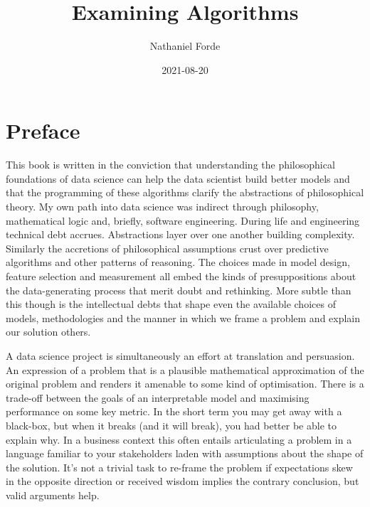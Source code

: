 \documentclass[]{tufte-book}
\title{Examining Algorithms}
\author{Nathaniel Forde}
\date{2021-08-20}
\theoremstyle{definition}
\theoremstyle{definition}
\theoremstyle{definition}
\theoremstyle{remark}
\begin{document}
\maketitle



{
\setcounter{tocdepth}{1}
\tableofcontents
}

\hypertarget{preface}{%
\chapter{Preface}\label{preface}}

This book is written in the conviction that understanding the philosophical foundations of data science can help the data scientist build better models and that the programming of these algorithms clarify the abstractions of philosophical theory. My own path into data science was indirect through philosophy, mathematical logic and, briefly, software engineering. During life and engineering technical debt accrues. Abstractions layer over one another building complexity. Similarly the accretions of philosophical assumptions crust over predictive algorithms and other patterns of reasoning. The choices made in model design, feature selection and measurement all embed the kinds of presuppositions about the data-generating process that merit doubt and rethinking. More subtle than this though is the intellectual debts that shape even the available choices of models, methodologies and the manner in which we frame a problem and explain our solution others.

A data science project is simultaneously an effort at translation and persuasion. An expression of a problem that is a plausible mathematical approximation of the original problem and renders it amenable to some kind of optimisation. There is a trade-off between the goals of an interpretable model and maximising performance on some key metric. In the short term you may get away with a black-box, but when it breaks (and it will break), you had better be able to explain why. In a business context this often entails articulating a problem in a language familiar to your stakeholders laden with assumptions about the shape of the solution. It's not a trivial task to re-frame the problem if expectations skew in the opposite direction or received wisdom implies the contrary conclusion, but valid arguments help.
\end{document}
